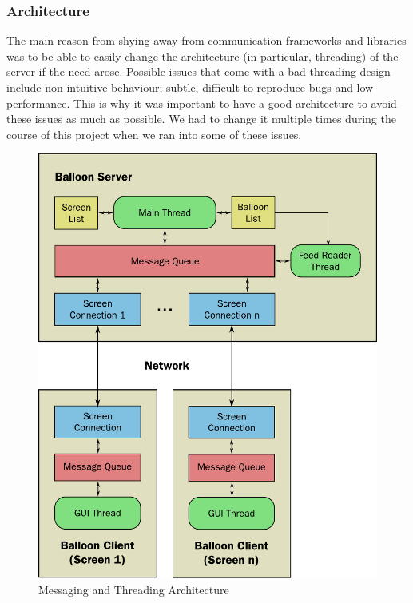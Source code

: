 \subsubsection{Architecture}

The main reason from shying away from communication frameworks and libraries was
to be able to easily change the architecture (in particular, threading) of the 
server if the need arose. Possible issues that come with a bad threading design 
include non-intuitive behaviour; subtle, difficult-to-reproduce bugs and low 
performance. This is why it was important to have a good architecture to avoid 
these issues as much as possible. We had to change it multiple times during the 
course of this project when we ran into some of these issues.

\begin{figure}
\begin{centering}
\includegraphics[scale=0.95]{Diagrams/messaging}
\par\end{centering}

\caption{Messaging and Threading Architecture}
\label{Messaging-Arch}
\end{figure}

